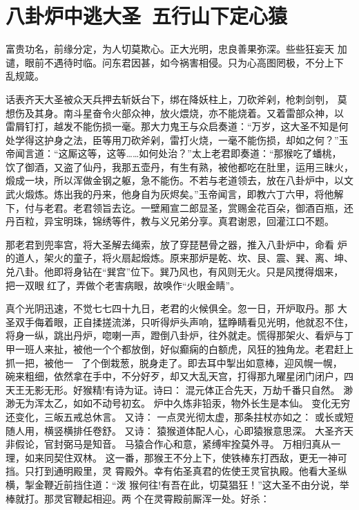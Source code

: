 \chapter{八卦炉中逃大圣~五行山下定心猿}

富贵功名，前缘分定，为人切莫欺心。正大光明，忠良善果弥深。些些狂妄天
加谴，眼前不遇待时临。问东君因甚，如今祸害相侵。只为心高图罔极，不分上下
乱规箴。

话表齐天大圣被众天兵押去斩妖台下，绑在降妖柱上，刀砍斧剁，枪刺剑刳，
莫想伤及其身。南斗星奋令火部众神，放火煨烧，亦不能烧着。又着雷部众神，以
雷屑钉打，越发不能伤损一毫。那大力鬼王与众启奏道：“万岁，这大圣不知是何
处学得这护身之法，臣等用刀砍斧剁，雷打火烧，一毫不能伤损，却如之何？”玉
帝闻言道：“这厮这等，这等……如何处治？”太上老君即奏道：“那猴吃了蟠桃，
饮了御酒，又盗了仙丹，我那五壶丹，有生有熟，被他都吃在肚里，运用三昧火，
煅成一块，所以浑做金钢之躯，急不能伤。不若与老道领去，放在八卦炉中，以文
武火煅炼。炼出我的丹来，他身自为灰烬矣。”玉帝闻言，即教六丁六甲，将他解
下，付与老君。老君领旨去讫。一壁厢宣二郎显圣，赏赐金花百朵，御酒百瓶，还
丹百粒，异宝明珠，锦绣等件，教与义兄弟分享。真君谢恩，回灌江口不题。

那老君到兜率宫，将大圣解去绳索，放了穿琵琶骨之器，推入八卦炉中，命看
炉的道人，架火的童子，将火扇起煅炼。原来那炉是乾、坎、艮、震、巽、离、坤、
兑八卦。他即将身钻在“巽宫”位下。巽乃风也，有风则无火。只是风搅得烟来，
把一双眼红了，弄做个老害病眼，故唤作“火眼金睛”。

真个光阴迅速，不觉七七四十九日，老君的火候俱全。忽一日，开炉取丹。那
大圣双手侮着眼，正自揉搓流涕，只听得炉头声响，猛睁睛看见光明，他就忍不住，
将身一纵，跳出丹炉，唿喇一声，蹬倒八卦炉，往外就走。慌得那架火、看炉与丁
甲一班人来扯，被他一个个都放倒，好似癫痫的白额虎，风狂的独角龙。老君赶上
抓一把，被他一，了个倒栽葱，脱身走了。即去耳中掣出如意棒，迎风幌一幌，
碗来粗细，依然拿在手中，不分好歹，却又大乱天宫，打得那九曜星闭门闭户，四
天王无影无形。好猴精!有诗为证。诗曰：
混元体正合先天，万劫千番只自然。
渺渺无为浑太乙，如如不动号初玄。
炉中久炼非铅汞，物外长生是本仙。
变化无穷还变化，三皈五戒总休言。
又诗：
一点灵光彻太虚，那条拄杖亦如之：
或长或短随人用，横竖横排任卷舒。
又诗：
猿猴道体配人心，心即猿猴意思深。
大圣齐天非假论，官封弼马是知音。
马猿合作心和意，紧缚牢拴莫外寻。
万相归真从一理，如来同契住双林。
这一番，那猴王不分上下，使铁棒东打西敌，更无一神可挡。只打到通明殿里，灵
霄殿外。幸有佑圣真君的佐使王灵官执殿。他看大圣纵横，掣金鞭近前挡住道：“泼
猴何往!有吾在此，切莫猖狂！”这大圣不由分说，举棒就打。那灵官鞭起相迎。两
个在灵霄殿前厮浑一处。好杀：

